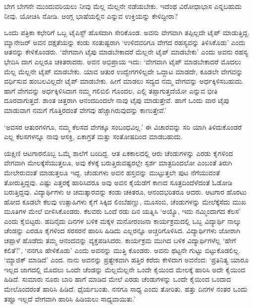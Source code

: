 ಬೇಗ ಬೇಗನೇ ಮುಂದುವರಿಯಲು ನೀವು ಮೆಲ್ಲ ಮೆಲ್ಲನೇ ನಡೆಯಬೇಕು. ಇದೆಂಥ ವಿರೋಧಾ\-ಭಾಸ ಎನ್ನಬಹುದು ನೀವು. ಯೋಚಿಸಿ ನೋಡಿ. ಆಂಗ್ಲ ಭಾಷೆಯಲ್ಲಿನ  ಎನ್ನುವ ಉಕ್ತಿಯನ್ನು ಕೇಳಿದ್ದೀರಾ?

ಒಂದು ಪತ್ರಿಕಾ ಕಛೇರಿಗೆ ಒಬ್ಬ ಟೈಪಿಸ್ಟ್ ಹೊಸದಾಗಿ ಸೇರಿಕೊಂಡ. ಅವನು ವೇಗವಾಗಿ ತಪ್ಪಿಲ್ಲದೇ ಟೈಪ್ ಮಾಡುತ್ತಿದ್ದ. ಮ್ಯಾನೇಜರ್ ಅವನ ದಕ್ಷತೆಯನ್ನು ಕಂಡು ಸಂತುಷ್ಟರಾಗಿ ‘ಉಳಿದವರಿಗೂ ವೇಗದ ರಹಸ್ಯವನ್ನು ತಿಳಿಸಿಕೊಡು’ ಎಂದು ಆತನನ್ನು ಕೇಳಿಕೊಂಡರು. ‘ವೇಗವಾಗಿ ಟೈಪು ಮಾಡಬೇಕಾದರೆ ಮೆಲ್ಲನೇ ಟೈಪ್ ಮಾಡಬೇಕು’ ಎಂದು ಅವನು ರಹಸ್ಯ ಭೇದಿಸಿ ದಾಗ ಎಲ್ಲರೂ ಚಕಿತರಾದರು. ಅವನ ಅಭಿಪ್ರಾಯ ಇದು: ‘ವೇಗವಾಗಿ ಟೈಪ್ ಮಾಡಬೇಕಾದರೆ ಮೊದಲು ಮೆಲ್ಲ ಮೆಲ್ಲನೇ ಟೈಪ್ ಮಾಡಬೇಕು. ಯಾವ ಆತುರ ಉದ್ವೇಗಗಳಿಲ್ಲದೇ ಒದ್ದಾಟ ಮಾಡದೇ, ಕೂಡಲೇ ವೇಗವನ್ನು ವರ್ಧಿಸುವ ಹಂಬಲವಿಲ್ಲದೇ ಟೈಪ್ ಮಾಡಬೇಕು. ಹೀಗೆ ಮಾಡಲು ಸದ್ಯದ ನಮ್ಮ ವೇಗವನ್ನು ಅರ್ಧಕ್ಕಿಳಿಸಬಹುದು. ಹಾಗೆ ವೇಗವನ್ನು ಅರ್ಧಕ್ಕಿಳಿಸಿದಾಗ ನಮ್ಮ ಗಲಿಬಿಲಿ ಗೊಂದಲ, ಎಲ್ಲಿ ತಪ್ಪಾಗುತ್ತದೆಯೋ ಎನ್ನುವ ಭೀತಿ ದೂರವಾಗುತ್ತದೆ. ಶಾಂತ ಚಿತ್ತರಾಗಿ ಆನಂದದಿಂದಲೇ ನಾವು ಟೈಪು ಮಾಡುತ್ತೇವೆ. ಹಾಗೆ ಒಂದು ವಾರ ಟೈಪು ಮಾಡುವಾಗ ನಮಗೆ ಗೊತ್ತಿರದಂತೆ ವೇಗವು ಹೆಚ್ಚಾಗಿರುವುದನ್ನು ಕಾಣುತ್ತೇವೆ.’

‘ಅವಸರ ಆತುರಗಳಿಗೂ, ನಮ್ಮ ಕೆಲಸದ ವೇಗಕ್ಕೂ ಸಂಬಂಧವಿಲ್ಲ.’ ಈ ವಿಚಾರವನ್ನು ಸರಿ ಯಾಗಿ ತಿಳಿದುಕೊಂಡರೆ ಎಲ್ಲ ಕೆಲಸಗಳನ್ನೂ ನಾವು ಆಸಕ್ತಿ, ಏಕಾಗ್ರತೆ ಮತ್ತು ಸಂತೋಷದಿಂದ ಮಾಡಬಹುದು.

ಯಕ್ಷಿಣಿ ಆಟಗಾರನೊಬ್ಬ ಒಮ್ಮೆ ಶಾಲೆಗೆ ಬಂದಿದ್ದ. ಆತ ಏಕಕಾಲದಲ್ಲಿ ಆರು ಚೆಂಡುಗಳನ್ನು ಎರಡು ಕೈಗಳಿಂದ ವೇಗವಾಗಿ ಮೇಲಕ್ಕೆಸೆಯುತ್ತಲೂ, ಅವು ಕೆಳಕ್ಕೆ ಬರುತ್ತಿರುವಷ್ಟರಲ್ಲೇ ಸ್ಪರ್ಶ ಮಾತ್ರದಿಂದಲೋ ಎಂಬಂತೆ ತಿರುಗಿ ಮೇಲೇರುವಂತೆ ಮಾಡುತ್ತಲೂ ಇದ್ದ. ಚೆಂಡುಗಳು ಅವನ ಹಸ್ತವನ್ನು ಮುಟ್ಟುತ್ತಲೇ ಪುಟ ನೆಗೆಯುವಂತೆ ತೋರುತ್ತಿದ್ದವು. ಎಷ್ಟು ಎತ್ತರಕ್ಕೆ ಹಾರಿಸಿದರೂ ಅವು ಅವನ ಕೈಯೆಡೆಗೆ ಕಾಣದ ಸೂತ್ರದಿಂದೆಳೆದಂತೆ ಓಡೋಡಿ ಬರುತ್ತಿದ್ದವು. ವಿದ್ಯಾರ್ಥಿಗಳು ಆ ಚಮತ್ಕಾರವನ್ನು ಕಂಡು ಚಕಿತರೂ, ಆನಂದಭರಿತರೂ ಆದರು. ಆಟಗಾರ ಹೊರಟು ಹೋದ ಕೂಡಲೇ ಕೆಲವು ಉತ್ಸಾಹಿಗಳು ಕೈಗೆ ಸಿಕ್ಕಿದ ಲಿಂಬೆಹಣ್ಣು, ಮೂಸಂಬಿ, ಚೆಂಡುಗಳನ್ನು ಮೇಲೆಕ್ಕೆಸೆದು ಮುಖ ಮೂತಿಗಳ ಮೇಲೆ ಬೀಳಿಸಿಕೊಂಡರು. ಕೆಲವರು ಒಂದೆ ರಡು ದಿನ ಯತ್ನಿಸಿ ‘ಅಯ್ಯೊ, ಇದು ನಮ್ಮಿಂದಾಗದ ಕೆಲಸ’ ಎಂದು ಕೈಬಿಟ್ಟರು. ಹದಿನೈದು ದಿನಗಳ ಬಳಿಕ ಮಕ್ಕಳ ಮನೋರಂಜನಾ ಕಾರ್ಯಕ್ರಮದಲ್ಲಿ ಒಬ್ಬ ವಿದ್ಯಾರ್ಥಿ ನಾಲ್ಕು ಚೆಂಡನ್ನು ಎರಡೂ ಕೈಗಳಿಂದ ಸರಸರನೆ ಹಾರಿಸಿ ಹಿಡಿದು ಎಲ್ಲರನ್ನೂ ಅಚ್ಚರಿಗೊಳಿಸಿದ. ವಿದ್ಯಾರ್ಥಿಗಳು ಜೋರಾಗಿ ಚಪ್ಪಾಳೆ ಹೊಡೆದು ತಮ್ಮ ಆನಂದವನ್ನು ವ್ಯಕ್ತಪಡಿಸಿದರು. ಕಾರ್ಯಕ್ರಮ ಮುಗಿದ ಬಳಿಕ ವಿದ್ಯಾರ್ಥಿಗಳೆಲ್ಲ ‘ಹೇಗೆ ಕಲಿತೆ?’, ‘ನನಗೂ ಹೇಳಿಕೊಡು’ ಎಂದು ಅವನನ್ನು ಮುತ್ತಿ ಕೊಂಡರು. ಅವನು ಥಟ್ಟನೇ ಗುಟ್ಟು ಬಿಟ್ಟುಕೊಡಲಿಲ್ಲ. ‘ಮ್ಯಾಜಿಕ್ ಮಾಡಿದೆ’ ಎಂದ. ನಾನು ಅವನನ್ನು ಪ್ರತ್ಯೇಕವಾಗಿ ಹತ್ತಿರ ಕರೆದು ಕೇಳಿದಾಗ ಅವನೆಂದ: ‘ಪ್ರತಿನಿತ್ಯ ಯಾರೂ ಇಲ್ಲದ ಜಾಗದಲ್ಲಿ ಮೊದಲು ಒಂದೇ ಚೆಂಡನ್ನು ಮೆಲ್ಲಮೆಲ್ಲನೇ ಒಂದೇ ಕೈಯಿಂದ ಮೇಲಕ್ಕೆ ಹಾರಿಸಿ ಅದೇ ಕೈಯಿಂದ ಹಿಡಿದೆ. ಸುಮಾರು ನೂರು ಬಾರಿ ಹಾಗೆ ಮಾಡಿದ ಮೇಲೆ ಎರಡು ಚೆಂಡುಗಳನ್ನು ಒಂದೇ ಕೈಯಿಂದ ಒಂದಾದ ಮೇಲೊಂದರಂತೆ ಹಾರಿಸಿ ಹಿಡಿದೆ. ಧೈರ್ಯಬಂತು. ನನಗೂ ಸಾಧ್ಯ ಎಂದು ತೋರಿತು. ಹತ್ತು ದಿನಗಳ ನಂತರ ಒಂದು ತಪ್ಪೂ ಇಲ್ಲದೆ ವೇಗವಾಗಿ ಹಾರಿಸಿ ಹಿಡಿಯಲು ಸಾಧ್ಯವಾಯಿತು.’

\vskip 2pt

